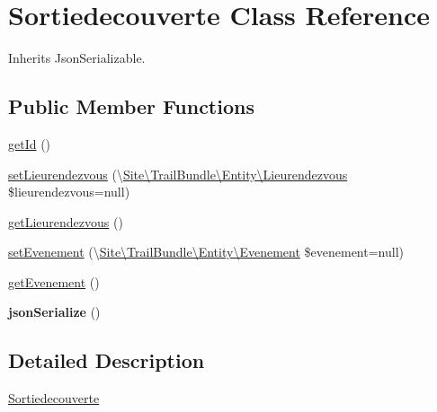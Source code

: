 \hypertarget{class_site_1_1_trail_bundle_1_1_entity_1_1_sortiedecouverte}{}\section{Sortiedecouverte Class Reference}
\label{class_site_1_1_trail_bundle_1_1_entity_1_1_sortiedecouverte}


Inherits Json\+Serializable.

\subsection*{Public Member Functions}
\begin{DoxyCompactItemize}
\item 
\hyperlink{class_site_1_1_trail_bundle_1_1_entity_1_1_sortiedecouverte_a12251d0c022e9e21c137a105ff683f13}{get\+Id} ()
\item 
\hyperlink{class_site_1_1_trail_bundle_1_1_entity_1_1_sortiedecouverte_a5dc3f5a82e8d1722058c57265ea6bf0e}{set\+Lieurendezvous} (\textbackslash{}\hyperlink{class_site_1_1_trail_bundle_1_1_entity_1_1_lieurendezvous}{Site\textbackslash{}\+Trail\+Bundle\textbackslash{}\+Entity\textbackslash{}\+Lieurendezvous} \$lieurendezvous=null)
\item 
\hyperlink{class_site_1_1_trail_bundle_1_1_entity_1_1_sortiedecouverte_a5d3814ddf8f5e72117a6179bc51e49e9}{get\+Lieurendezvous} ()
\item 
\hyperlink{class_site_1_1_trail_bundle_1_1_entity_1_1_sortiedecouverte_a6ed044dcb38f66a09b105075b59bd8ed}{set\+Evenement} (\textbackslash{}\hyperlink{class_site_1_1_trail_bundle_1_1_entity_1_1_evenement}{Site\textbackslash{}\+Trail\+Bundle\textbackslash{}\+Entity\textbackslash{}\+Evenement} \$evenement=null)
\item 
\hyperlink{class_site_1_1_trail_bundle_1_1_entity_1_1_sortiedecouverte_a0d200fcb8e70d13b45e20baf2269ed3f}{get\+Evenement} ()
\item 
\hypertarget{class_site_1_1_trail_bundle_1_1_entity_1_1_sortiedecouverte_ad402d8679325bc514874370f02b5c2ac}{}{\bfseries json\+Serialize} ()\label{class_site_1_1_trail_bundle_1_1_entity_1_1_sortiedecouverte_ad402d8679325bc514874370f02b5c2ac}

\end{DoxyCompactItemize}


\subsection{Detailed Description}
\hyperlink{class_site_1_1_trail_bundle_1_1_entity_1_1_sortiedecouverte}{Sortiedecouverte}

